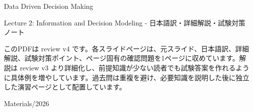 \documentclass[a4paper,10pt]{article}
\begin{document}
\begin{titlepage}
\centering
\vspace*{2cm}
{\Huge Data Driven Decision Making\par}
\vspace{0.5cm}
{\Large Lecture 2: Information and Decision Modeling - 日本語訳・詳細解説・試験対策ノート\par}
\vspace{1cm}
\begin{minipage}{0.88\textwidth}
このPDFは review v4 です。各スライドページは、元スライド、日本語訳、詳細解説、試験対策ポイント、ページ固有の確認問題を1ページに収めています。解説は review v3 より詳細化し、前提知識が少ない読者でも試験答案を作れるように具体例を増やしています。過去問は重複を避け、必要知識を説明した後に独立した演習ページとして配置しています。
\end{minipage}
\vfill
{\large Materials/2026}
\end{titlepage}
\tableofcontents
\clearpage

\end{document}

